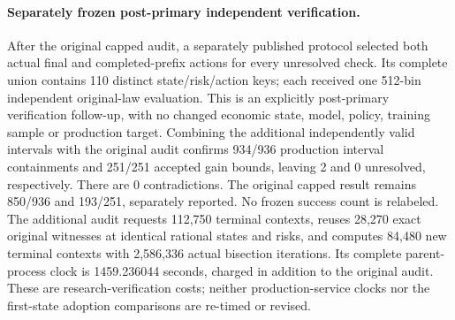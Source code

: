 \paragraph{Separately frozen post-primary independent verification.}
After the original capped audit, a separately published protocol selected both actual final and completed-prefix actions for every unresolved check. Its complete union contains 110 distinct state/risk/action keys; each received one 512-bin independent original-law evaluation. This is an explicitly post-primary verification follow-up, with no changed economic state, model, policy, training sample or production target.
Combining the additional independently valid intervals with the original audit confirms 934/936 production interval containments and 251/251 accepted gain bounds, leaving 2 and 0 unresolved, respectively. There are 0 contradictions. The original capped result remains 850/936 and 193/251, separately reported. No frozen success count is relabeled.
The additional audit requests 112,750 terminal contexts, reuses 28,270 exact original witnesses at identical rational states and risks, and computes 84,480 new terminal contexts with 2,586,336 actual bisection iterations. Its complete parent-process clock is 1459.236044 seconds, charged in addition to the original audit. These are research-verification costs; neither production-service clocks nor the first-state adoption comparisons are re-timed or revised.
